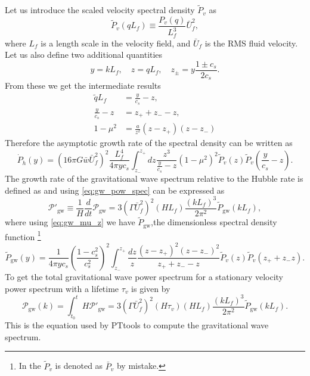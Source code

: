 Let us introduce the scaled velocity spectral density $\tilde{P}_v$ as
\begin{equation}
\tilde{P}_v(qL_f) \equiv \frac{P_v(q)}{L_f^3} \bar{U}_f^2,
\end{equation}
where $L_f$ is a length scale in the velocity field, and $\bar{U}_f$ is the RMS fluid velocity.
Let us also define two additional quantities
\begin{equation}
y = kL_f, \quad z = qL_f, \quad z_\pm = y \frac{1 \pm c_s}{2 c_s}.
\label{eq:gw_yz}
\end{equation}
From these we get the intermediate results
\begin{align}
\tilde{q}L_f &= \frac{y}{c_s} - z, \\
\frac{y}{c_s} - z &= z_+ + z_- - z, \\
1 - \mu^2 &= \frac{a}{z^2}(z-z_+)(z-z_-)
\label{eq:gw_mu_z}
\end{align}
Therefore the asymptotic growth rate of the spectral density can be written as
\begin{equation}
\dot{P}_{\dot{h}}(y) =
\left( 16 \pi G \bar{w} \bar{U}_f^2 \right)^2
\frac{L_f^4}{4 \pi y c_s}
\int_{z_-}^{z_+} dz
\frac{z^3}{\frac{y}{c_s} - z}
(1 - \mu^2)^2
\tilde{P}_v (z) \tilde{P}_v (\frac{y}{c_s} - z).
\end{equation}
The growth rate of the gravitational wave spectrum relative to the Hubble rate is defined as and using \eqref{eq:gw_pow_spec} can be expressed as
\cite[eq. 3.46]{hindmarsh_gw_pt_2019}
\begin{equation}
\mathcal{P}'_{\text{gw}} \equiv \frac{1}{H} \frac{d}{dt} \mathcal{P}_{\text{gw}}
= 3 \left( \Gamma \bar{U}_f^2 \right)^2 (HL_f) \frac{(kL_f)^3}{2 \pi^2} \tilde{P}_{\text{gw}} (kL_f),
\end{equation}
where using \eqref{eq:gw_mu_z} we have $\tilde{P}_{\text{gw}}$,the dimensionless spectral density function
\cite[eq. 3.47]{hindmarsh_gw_pt_2019}
\footnote{In \cite{hindmars_gw_pt_2019} the $\tilde{P}_v$ is denoted as $\bar{P}_v$ by mistake.}
\begin{equation}
\tilde{P}_\text{gw} (y) = \frac{1}{4\pi yc_s} \left(\frac{1-c_s^2}{c_s^2}\right)^2
\int_{z_-}^{z_+} \frac{dz}{z}
\frac{(z-z_+)^2(z-z_-)^2}{z_+ + z_- - z}
\tilde{P}_v (z) \tilde{P}_v (z_+ + z_- z).
\end{equation}
To get the total gravitational wave power spectrum for a stationary velocity power spectrum with a lifetime $\tau_v$ is given by
\begin{equation}
\mathcal{P}_\text{gw}(k)
= \int_{t_0}^{t} H \mathcal{P}'_\text{gw}
= 3 \left( \Gamma \bar{U}_f^2 \right)^2 (H \tau_v)(H L_f) \frac{(kL_f)^3}{2\pi^2} \tilde{P}_\text{gw} (kL_f).
\end{equation}
This is the equation used by PTtools to compute the gravitational wave spectrum.



\cites{hindmarsh_gw_pt_2019}[ch. 8]{lecture_notes}
